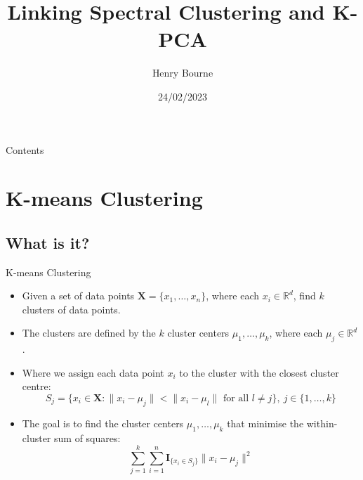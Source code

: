 \documentclass[aspectratio=169]{beamer}
\title{Linking Spectral Clustering and K-PCA}
\author{Henry Bourne}
\date{24/02/2023}
\begin{document}



\begin{frame}[leftcolor=BrightAqua,rightcolor=DarkAqua,div=0.8\paperwidth]
  \titlepage
\end{frame}


\begin{frame}{Contents}
  \tableofcontents
\end{frame}

\section{K-means Clustering}
\subsection{What is it?}
\begin{frame}{K-means Clustering}
  \begin{itemize}
    \item Given a set of data points $\mathbf{X} = \{x_{1},\ldots,x_{n}\}$, where each $x_{i} \in \mathbb{R}^{d}$, find $k$ clusters of data points.
    \item The clusters are defined by the $k$ cluster centers $\mu_{1},\ldots,\mu_{k}$, where each $\mu_{j} \in \mathbb{R}^{d}$.
    \item Where we assign each data point $x_{i}$ to the cluster with the closest cluster centre:
      \begin{equation*}
        S_{j} = \{x_{i} \in \mathbf{X} : \|x_{i} - \mu_{j}\| < \|x_{i} - \mu_{l}\| \text{ for all } l \neq j\}, \: j \in \{1,\ldots,k\}
      \end{equation*}
    \item The goal is to find the cluster centers $\mu_{1},\ldots,\mu_{k}$ that minimise the within-cluster sum of squares:
      \begin{equation*}
        \sum_{j=1}^{k} \sum_{i=1}^{n} \mathbf{I}_{\{x_{i} \in S_{j}\}} \|x_{i} - \mu_{j}\|^{2}
      \end{equation*}
  \end{itemize}
\end{frame}
\end{document}
